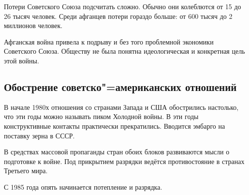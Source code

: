     Потери Советского Союза подсчитать сложно. Обычно они колеблются от 15 до 26 тысяч человек. Среди афганцев потери гораздо больше: от 600 тысяч до 2 миллионов человек.
    
    Афганская война привела к подрыву и без того проблемной экономики Советского Союза. Обществу не была понятна идеологическая и конкретная цель этой войны.

    \subsection{Обострение советско"=американских отношений}
    
    В начале 1980х отношения со странами Запада и США обострились настолько, что эти годы можно называть пиком Холодной войны. В эти годы конструктивные контакты практически прекратились. Вводится эмбарго на поставку зерна в СССР.
    
    В средствах массовой пропаганды стран обоих блоков развиваются мысли о подготовке к войне. Под прикрытием разрядки ведётся противостояние в странах Третьего мира.
    
    С 1985 года опять начинается потепление и разрядка.
    